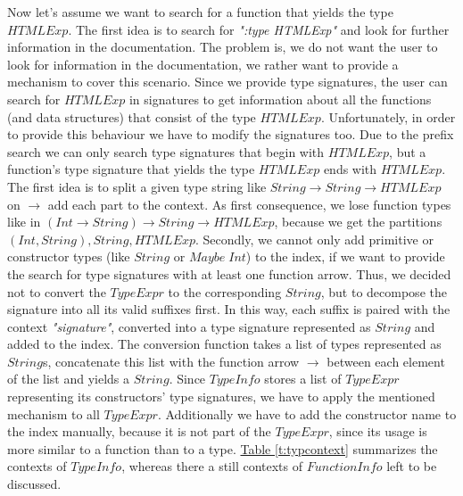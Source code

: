 \documentclass[%
	pdftex,%
	a4paper,%
	oneside,%
	chapterprefix,%
	headsepline,%
	12pt%
]{scrbook}
\newcommand{\textss}[1]{"#1"}
\newcommand{\Conid}[1]{\mathit{#1}}
\begin{document}
Now let's assume we want to search for a function that yields the type
\ensuremath{\Conid{HTMLExp}}. %
The first idea is to search for \emph{\textss{:type HTMLExp}} and look
for further information in the documentation. %
The problem is, we do not want the user to look for information in the
documentation, we rather want to provide a mechanism to cover this
scenario. %
Since we provide type signatures, the user can search for \ensuremath{\Conid{HTMLExp}} in
signatures to get information about all the functions (and data
structures) that consist of the type \ensuremath{\Conid{HTMLExp}}. %
Unfortunately, in order to provide this behaviour we have to modify
the signatures too. %
Due to the prefix search we can only search type signatures that begin
with \ensuremath{\Conid{HTMLExp}}, but a function's type signature that yields the type
\ensuremath{\Conid{HTMLExp}} ends with \ensuremath{\Conid{HTMLExp}}. %
The first idea is to split a given type string like \ensuremath{\Conid{String}\to \Conid{String}\to \Conid{HTMLExp}} on \ensuremath{\to } add each part to the context. As first
consequence, we lose function types like in \ensuremath{(\Conid{Int}\to \Conid{String})\to \Conid{String}\to \Conid{HTMLExp}}, because we get the partitions \ensuremath{(\Conid{Int},\Conid{String}),\Conid{String},\Conid{HTMLExp}}. %
Secondly, we cannot only add primitive or constructor types (like
\ensuremath{\Conid{String}} or \ensuremath{\Conid{Maybe}\;\Conid{Int}}) to the index, if we want to provide the
search for type signatures with at least one function arrow. %
Thus, we decided not to convert the \ensuremath{\Conid{TypeExpr}} to the corresponding
\ensuremath{\Conid{String}}, but to decompose the signature into all its valid suffixes
first.%
In this way, each suffix is paired with the context
\emph{\textss{signature}}, converted into a type signature represented
as \ensuremath{\Conid{String}} and added to the index. The conversion function takes a
list of types represented as \ensuremath{\Conid{String}}s, concatenate this list with the
function arrow \ensuremath{\to } between each element of the list and yields a
\ensuremath{\Conid{String}}. %
Since \ensuremath{\Conid{TypeInfo}} stores a list of \ensuremath{\Conid{TypeExpr}} representing its
constructors' type signatures, we have to apply the mentioned
mechanism to all \ensuremath{\Conid{TypeExpr}}. %
Additionally we have to add the constructor name to the index
manually, because it is not part of the \ensuremath{\Conid{TypeExpr}}, since its usage is
more similar to a function than to a type. %
\hyperref[t:typcontext]{Table \ref{t:typcontext}} summarizes the
contexts of \ensuremath{\Conid{TypeInfo}}, whereas there a still contexts of
\ensuremath{\Conid{FunctionInfo}} left to be discussed. %
\end{document}
